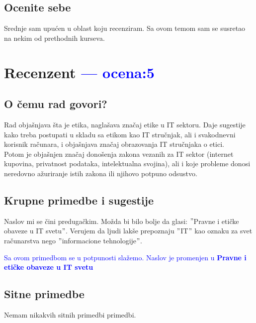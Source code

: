 \documentclass[a4paper]{report}
\newcommand{\odgovor}[1]{\textcolor{blue}{#1}}
\begin{document}
\section{Ocenite sebe}
Srednje sam upućen u oblast koju recenziram. Sa ovom temom sam se susretao na nekim od prethodnih kurseva.

\chapter{Recenzent \odgovor{--- ocena:5} }

\section{O čemu rad govori?}
Rad objašnjava šta je etika, naglašava značaj etike u IT sektoru. Daje sugestije kako treba postupati u skladu sa etikom kao IT stručnjak, ali i svakodnevni korisnik računara, i objašnjava značaj obrazovanja IT stručnjaka o etici.\\
Potom je objašnjen značaj donošenja zakona vezanih za IT sektor (internet kupovina, privatnost podataka, intelektualna svojina), ali i koje probleme donosi neredovno ažuriranje istih zakona ili njihovo potpuno odsustvo.

\section{Krupne primedbe i sugestije}
Naslov mi se čini predugačkim. Možda bi bilo bolje da glasi: $"$Pravne i etičke obaveze u IT svetu$"$. Verujem da ljudi lakše prepoznaju $"$IT$"$ kao oznaku za svet računarstva nego $"$informacione tehnologije$"$.

\odgovor{Sa ovom primedbom se u potpunosti slažemo. Naslov je promenjen u \textbf{Pravne i etičke obaveze u IT svetu}}

\section{Sitne primedbe}
Nemam nikakvih sitnih primedbi primedbi.
\end{document}
